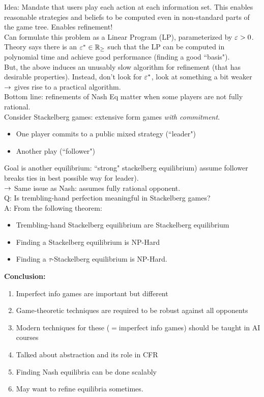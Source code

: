 Idea: Mandate that users play each action at each information set. This enables reasonable strategies and beliefs to be computed even in non-standard parts of the game tree. Enables refinement!\\

Can formulate this problem as a Linear Program (LP), parameterized by $\varepsilon > 0$. Theory says there is an $\varepsilon^* \in \mathbb{R}_{\geq}$ such that the LP can be computed in polynomial time and achieve good performance (finding a good ``basis"). \\

But, the above induces an unusably slow algorithm for refinement (that has desirable properties). Instead, don't look for $\varepsilon^*$, look at something a bit weaker $\rightarrow$ gives rise to a practical algorithm. \\

Bottom line: refinements of Nash Eq matter when some players are not fully rational. \\

Consider Stackelberg games: extensive form games {\it with commitment}.
\begin{itemize}
    \item One player commits to a public mixed strategy (``leader")
    \item Another play (``follower")
\end{itemize}

Goal is another equilibrium: ``strong" stackelberg equilibrium) assume follower breaks ties in best possible way for leader). \\

$\rightarrow$ Same issue as Nash: assumes fully rational opponent. \\

Q: Is trembling-hand perfection meaningful in Stackelberg games? \\

A: From the following theorem:
\begin{theorem}
\begin{itemize}
    \item Trembling-hand Stackelberg equilibrium are Stackelberg equilibrium
    \item Finding a Stackelberg equilibrium is NP-Hard
    \item Finding a $\tau$-Stackelberg equilibrium is NP-Hard.
\end{itemize}
\end{theorem}

{\bf Conclusion:}
\begin{enumerate}
    \item Imperfect info games are important but different
    \item Game-theoretic techniques are required to be robust against all opponents
    \item Modern techniques for these ($=$imperfect info games) should be taught in AI courses
    \item Talked about abstraction and its role in CFR
    \item Finding Nash equilibria can be done scalably
    \item May want to refine equilibria sometimes.
\end{enumerate}

